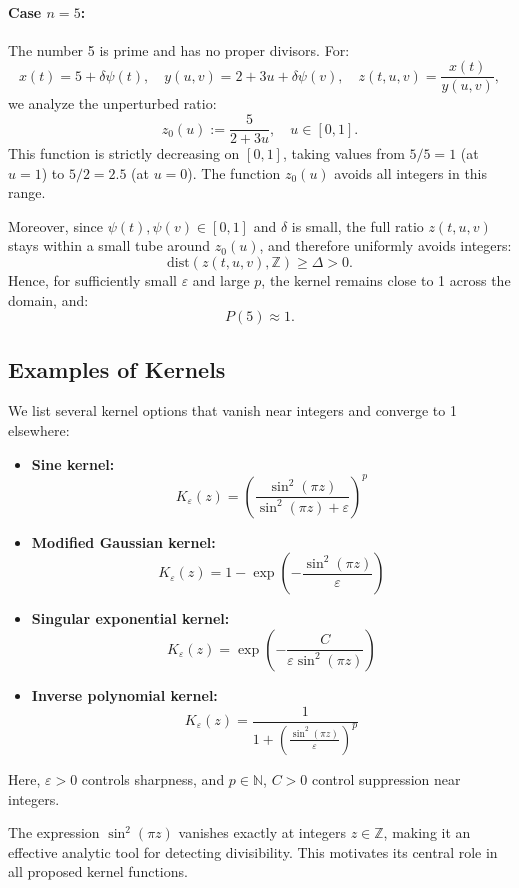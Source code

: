 \documentclass[12pt]{article}
\theoremstyle{definition}
\theoremstyle{plain}
\theoremstyle{remark}
\begin{document}
\paragraph{Case \( n = 5 \):}  
The number 5 is prime and has no proper divisors. For:
\[
x(t) = 5 + \delta \psi(t), \quad y(u,v) = 2 + 3u + \delta \psi(v),
\quad z(t,u,v) = \frac{x(t)}{y(u,v)},
\]
we analyze the unperturbed ratio:
\[
z_0(u) := \frac{5}{2 + 3u}, \quad u \in [0,1].
\]
This function is strictly decreasing on \( [0,1] \), taking values from \( 5/5 = 1 \) (at \( u = 1 \)) to \( 5/2 = 2.5 \) (at \( u = 0 \)). The function \( z_0(u) \) avoids all integers in this range.

Moreover, since \( \psi(t), \psi(v) \in [0,1] \) and \( \delta \) is small, the full ratio \( z(t,u,v) \) stays within a small tube around \( z_0(u) \), and therefore uniformly avoids integers:
\[
\mathrm{dist}(z(t,u,v), \mathbb{Z}) \geq \Delta > 0.
\]
Hence, for sufficiently small \( \varepsilon \) and large \( p \), the kernel remains close to 1 across the domain, and:
\[
P(5) \approx 1.
\]

\subsection{Examples of Kernels}

We list several kernel options that vanish near integers and converge to 1 elsewhere:

\begin{itemize}
  \item \textbf{Sine kernel:}
  \[
  K_\varepsilon(z) = \left( \frac{\sin^2(\pi z)}{\sin^2(\pi z) + \varepsilon} \right)^p
  \]
  \item \textbf{Modified Gaussian kernel:}
  \[
  K_\varepsilon(z) = 1 - \exp\left( -\frac{\sin^2(\pi z)}{\varepsilon} \right)
  \]
  \item \textbf{Singular exponential kernel:}
  \[
  K_\varepsilon(z) = \exp\left( -\frac{C}{\varepsilon \sin^2(\pi z)} \right)
  \]
  \item \textbf{Inverse polynomial kernel:}
  \[
  K_\varepsilon(z) = \frac{1}{1 + \left( \frac{\sin^2(\pi z)}{\varepsilon} \right)^p }
  \]
\end{itemize}

Here, \( \varepsilon > 0 \) controls sharpness, and \( p \in \mathbb{N} \), \( C > 0 \) control suppression near integers.

The expression \( \sin^2(\pi z) \) vanishes exactly at integers \( z \in \mathbb{Z} \), making it an effective analytic tool for detecting divisibility. This motivates its central role in all proposed kernel functions.
\end{document}
